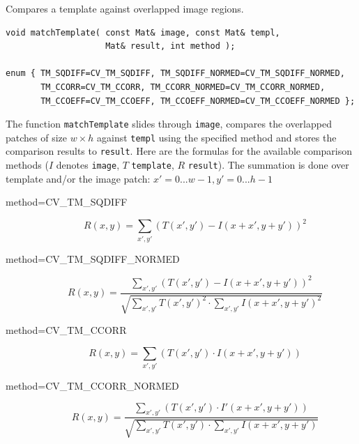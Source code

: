\begin{description}
\label{matchTemplate}
Compares a template against overlapped image regions.

\begin{lstlisting}
void matchTemplate( const Mat& image, const Mat& templ,
                    Mat& result, int method );

enum { TM_SQDIFF=CV_TM_SQDIFF, TM_SQDIFF_NORMED=CV_TM_SQDIFF_NORMED,
       TM_CCORR=CV_TM_CCORR, TM_CCORR_NORMED=CV_TM_CCORR_NORMED,
       TM_CCOEFF=CV_TM_CCOEFF, TM_CCOEFF_NORMED=CV_TM_CCOEFF_NORMED };
\end{lstlisting}
\begin{description}
\end{description}

The function \texttt{matchTemplate} slides through \texttt{image}, compares the
overlapped patches of size $w \times h$ against \texttt{templ}
using the specified method and stores the comparison results to
\texttt{result}. Here are the formulas for the available comparison
methods ($I$ denotes \texttt{image}, $T$ \texttt{template},
$R$ \texttt{result}). The summation is done over template and/or the
image patch: $x' = 0...w-1, y' = 0...h-1$


\begin{description}
\item[method=CV\_TM\_SQDIFF]
\[ R(x,y)=\sum_{x',y'} (T(x',y')-I(x+x',y+y'))^2 \]

\item[method=CV\_TM\_SQDIFF\_NORMED]
\[ R(x,y)=\frac
{\sum_{x',y'} (T(x',y')-I(x+x',y+y'))^2}
{\sqrt{\sum_{x',y'}T(x',y')^2 \cdot \sum_{x',y'} I(x+x',y+y')^2}}
\]

\item[method=CV\_TM\_CCORR]
\[ R(x,y)=\sum_{x',y'} (T(x',y') \cdot I(x+x',y+y')) \]

\item[method=CV\_TM\_CCORR\_NORMED]
\[ R(x,y)=\frac
{\sum_{x',y'} (T(x',y') \cdot I'(x+x',y+y'))}
{\sqrt{\sum_{x',y'}T(x',y') \cdot \sum_{x',y'} I(x+x',y+y')}}
\]


\end{description}
\end{description}
